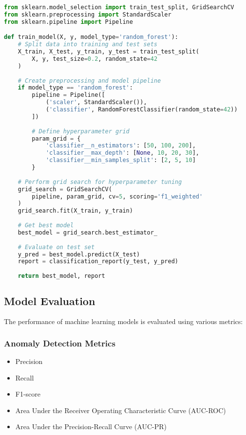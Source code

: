 \begin{lstlisting}[language=Python, caption=Model Training Pipeline]
from sklearn.model_selection import train_test_split, GridSearchCV
from sklearn.preprocessing import StandardScaler
from sklearn.pipeline import Pipeline

def train_model(X, y, model_type='random_forest'):
    # Split data into training and test sets
    X_train, X_test, y_train, y_test = train_test_split(
        X, y, test_size=0.2, random_state=42
    )
    
    # Create preprocessing and model pipeline
    if model_type == 'random_forest':
        pipeline = Pipeline([
            ('scaler', StandardScaler()),
            ('classifier', RandomForestClassifier(random_state=42))
        ])
        
        # Define hyperparameter grid
        param_grid = {
            'classifier__n_estimators': [50, 100, 200],
            'classifier__max_depth': [None, 10, 20, 30],
            'classifier__min_samples_split': [2, 5, 10]
        }
    
    # Perform grid search for hyperparameter tuning
    grid_search = GridSearchCV(
        pipeline, param_grid, cv=5, scoring='f1_weighted'
    )
    grid_search.fit(X_train, y_train)
    
    # Get best model
    best_model = grid_search.best_estimator_
    
    # Evaluate on test set
    y_pred = best_model.predict(X_test)
    report = classification_report(y_test, y_pred)
    
    return best_model, report
\end{lstlisting}

\subsection{Model Evaluation}
The performance of machine learning models is evaluated using various metrics:

\subsubsection{Anomaly Detection Metrics}
\begin{itemize}
    \item Precision
    \item Recall
    \item F1-score
    \item Area Under the Receiver Operating Characteristic Curve (AUC-ROC)
    \item Area Under the Precision-Recall Curve (AUC-PR)
\end{itemize}


